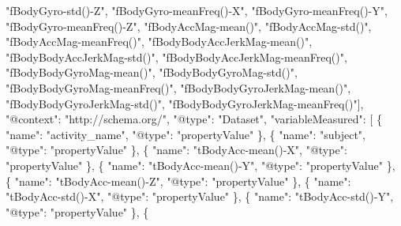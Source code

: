 \documentclass[
]{article}
\newenvironment{Shaded}{\begin{snugshade}}{\end{snugshade}}
\newcommand{\DataTypeTok}[1]{\textcolor[rgb]{0.13,0.29,0.53}{#1}}
\newcommand{\FunctionTok}[1]{\textcolor[rgb]{0.00,0.00,0.00}{#1}}
\newcommand{\OtherTok}[1]{\textcolor[rgb]{0.56,0.35,0.01}{#1}}
\newcommand{\StringTok}[1]{\textcolor[rgb]{0.31,0.60,0.02}{#1}}
\begin{document}
\begin{Shaded}
\begin{Highlighting}[]
\StringTok{"fBodyGyro{-}std(){-}Z"}\OtherTok{,} \StringTok{"fBodyGyro{-}meanFreq(){-}X"}\OtherTok{,} \StringTok{"fBodyGyro{-}meanFreq(){-}Y"}\OtherTok{,} \StringTok{"fBodyGyro{-}meanFreq(){-}Z"}\OtherTok{,} \StringTok{"fBodyAccMag{-}mean()"}\OtherTok{,} \StringTok{"fBodyAccMag{-}std()"}\OtherTok{,} \StringTok{"fBodyAccMag{-}meanFreq()"}\OtherTok{,} \StringTok{"fBodyBodyAccJerkMag{-}mean()"}\OtherTok{,} \StringTok{"fBodyBodyAccJerkMag{-}std()"}\OtherTok{,} \StringTok{"fBodyBodyAccJerkMag{-}meanFreq()"}\OtherTok{,} \StringTok{"fBodyBodyGyroMag{-}mean()"}\OtherTok{,} \StringTok{"fBodyBodyGyroMag{-}std()"}\OtherTok{,} \StringTok{"fBodyBodyGyroMag{-}meanFreq()"}\OtherTok{,} \StringTok{"fBodyBodyGyroJerkMag{-}mean()"}\OtherTok{,} \StringTok{"fBodyBodyGyroJerkMag{-}std()"}\OtherTok{,} \StringTok{"fBodyBodyGyroJerkMag{-}meanFreq()"}\OtherTok{]}\FunctionTok{,}
  \DataTypeTok{"@context"}\FunctionTok{:} \StringTok{"http://schema.org/"}\FunctionTok{,}
  \DataTypeTok{"@type"}\FunctionTok{:} \StringTok{"Dataset"}\FunctionTok{,}
  \DataTypeTok{"variableMeasured"}\FunctionTok{:} \OtherTok{[}
    \FunctionTok{\{}
      \DataTypeTok{"name"}\FunctionTok{:} \StringTok{"activity\_name"}\FunctionTok{,}
      \DataTypeTok{"@type"}\FunctionTok{:} \StringTok{"propertyValue"}
    \FunctionTok{\}}\OtherTok{,}
    \FunctionTok{\{}
      \DataTypeTok{"name"}\FunctionTok{:} \StringTok{"subject"}\FunctionTok{,}
      \DataTypeTok{"@type"}\FunctionTok{:} \StringTok{"propertyValue"}
    \FunctionTok{\}}\OtherTok{,}
    \FunctionTok{\{}
      \DataTypeTok{"name"}\FunctionTok{:} \StringTok{"tBodyAcc{-}mean(){-}X"}\FunctionTok{,}
      \DataTypeTok{"@type"}\FunctionTok{:} \StringTok{"propertyValue"}
    \FunctionTok{\}}\OtherTok{,}
    \FunctionTok{\{}
      \DataTypeTok{"name"}\FunctionTok{:} \StringTok{"tBodyAcc{-}mean(){-}Y"}\FunctionTok{,}
      \DataTypeTok{"@type"}\FunctionTok{:} \StringTok{"propertyValue"}
    \FunctionTok{\}}\OtherTok{,}
    \FunctionTok{\{}
      \DataTypeTok{"name"}\FunctionTok{:} \StringTok{"tBodyAcc{-}mean(){-}Z"}\FunctionTok{,}
      \DataTypeTok{"@type"}\FunctionTok{:} \StringTok{"propertyValue"}
    \FunctionTok{\}}\OtherTok{,}
    \FunctionTok{\{}
      \DataTypeTok{"name"}\FunctionTok{:} \StringTok{"tBodyAcc{-}std(){-}X"}\FunctionTok{,}
      \DataTypeTok{"@type"}\FunctionTok{:} \StringTok{"propertyValue"}
    \FunctionTok{\}}\OtherTok{,}
    \FunctionTok{\{}
      \DataTypeTok{"name"}\FunctionTok{:} \StringTok{"tBodyAcc{-}std(){-}Y"}\FunctionTok{,}
      \DataTypeTok{"@type"}\FunctionTok{:} \StringTok{"propertyValue"}
    \FunctionTok{\}}\OtherTok{,}
    \FunctionTok{\{}

\end{Highlighting}
\end{Shaded}
\end{document}
